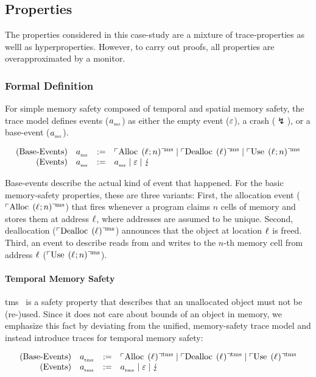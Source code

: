 \subsection{Properties}\label{subsec-cs-properties}

The properties considered in this case-study are a mixture of trace-properties as welll as hyperproperties.
However, to carry out proofs, all properties are overapproximated by a monitor.

\subsubsection{Formal Definition}\label{subsubsec-cs-properties-formaldef}

For simple memory safety composed of temporal and spatial memory safety, the trace model defines events ($\varEvent[_{\mssafe}]$) as either the empty event ($\emptyevent$), a crash ($\lightning$), or a base-event ($\varEvent[_{\mssafe}]$).

\begin{definition}{}
\[
  \begin{array}{rcll}
    \text{(Base-Events)}&\varEvent[_{\mssafe}] &:=& \msAlloc \mid \msDealloc \mid \msUse \\
    \text{(Events)}&\varEvent[_{\mssafe}] &:=& \varEvent[_{\mssafe}] \mid \emptyevent \mid \lightning \\ 
  \end{array}
\]
\end{definition}

Base-events describe the actual kind of event that happened.
For the basic memory-safety properties, these are three variants:
First, the allocation event ($\msAlloc$) that fires whenever a program claims $n$ cells of memory and stores them at address $\varLoc$, where addresses are assumed to be unique.
Second, deallocation ($\msDealloc$) announces that the object at location $\varLoc$ is freed.
Third, an event to describe reads from and writes to the $n$-th memory cell from address $\varLoc$ ($\msUse$).

\paragraph{Temporal Memory Safety}

\gls*{tms}~\cite{nagarakatte2010cets} is a safety property that describes that an unallocated object must not be (re-)used.
Since it does not care about bounds of an object in memory, we emphasize this fact by deviating from the unified, memory-safety trace model and instead introduce traces for temporal memory safety:
\begin{definition}{}
\[
  \begin{array}{rcll}
    \text{(Base-Events)}&\tmsEvent &:=& \tmsAlloc \mid \tmsDealloc \mid \tmsUse \\
    \text{(Events)}&\tmsEvent &:=& \tmsEvent \mid \emptyevent \mid \lightning \\ 
  \end{array}
\]
\end{definition}

